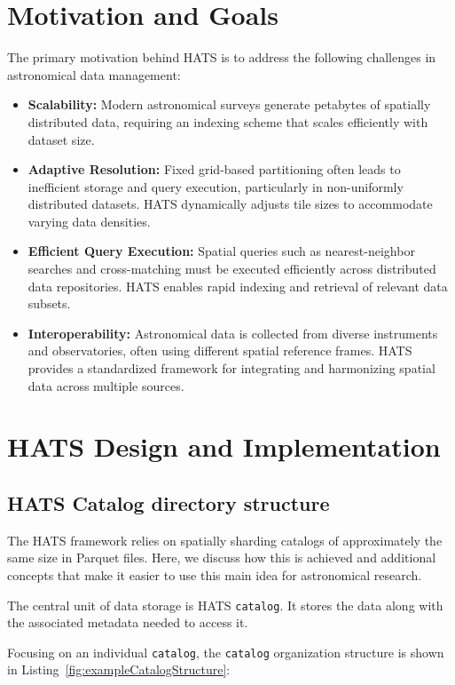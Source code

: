 \documentclass[11pt,a4paper]{ivoa}
\begin{document}
\section{Motivation and Goals}
The primary motivation behind HATS is to address the following challenges in astronomical data management:
\begin{itemize}
    \item \textbf{Scalability:} Modern astronomical surveys generate petabytes of spatially distributed data, requiring an indexing scheme that scales efficiently with dataset size.
    \item \textbf{Adaptive Resolution:} Fixed grid-based partitioning often leads to inefficient storage and query execution, particularly in non-uniformly distributed datasets. HATS dynamically adjusts tile sizes to accommodate varying data densities.
    \item \textbf{Efficient Query Execution:} Spatial queries such as nearest-neighbor searches and cross-matching must be executed efficiently across distributed data repositories. HATS enables rapid indexing and retrieval of relevant data subsets.
    \item \textbf{Interoperability:} Astronomical data is collected from diverse instruments and observatories, often using different spatial reference frames. 
    HATS provides a standardized framework for integrating and harmonizing spatial data across multiple sources.
\end{itemize}

\section{HATS Design and Implementation}

\subsection{HATS Catalog directory structure} \label{sec:catalog}

The HATS framework relies on spatially sharding catalogs 
of approximately the same size in Parquet files. Here, we discuss how this is achieved and
additional concepts that make it easier to use this main idea for astronomical
research.

The central unit of data storage is HATS \texttt{catalog}. 
It stores the data along with the associated metadata needed to access it. 

Focusing on an individual  \texttt{catalog}, the  \texttt{catalog} organization structure is shown in Listing~\ref{fig:exampleCatalogStructure}:
\end{document}
